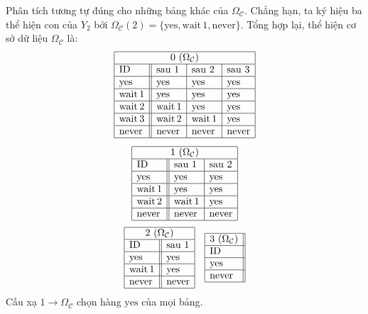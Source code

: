 Phân tích tương tự đúng cho những bảng khác của $\Omega_{\mathcal C}$. Chẳng hạn, ta ký hiệu ba thể hiện con của $Y_2$ bởi $\Omega_{\mathcal C}(2)=\{\mathrm{yes},\mathrm{wait}\,1,\mathrm{never}\}$. Tổng hợp lại, thể hiện cơ sở dữ liệu $\Omega_{\mathcal C}$ là:
\[
\begin{gathered}
\begin{array}{|l||l|l|l|}\hline\multicolumn{4}{|c|}{0\ (\Omega_{\mathcal C})}\\\hline\text{ID}&\text{sau 1}&\text{sau 2}&\text{sau 3}\\\hline
\mathrm{yes}&\mathrm{yes}&\mathrm{yes}&\mathrm{yes}\\\hline
\mathrm{wait}\,1&\mathrm{yes}&\mathrm{yes}&\mathrm{yes}\\\hline
\mathrm{wait}\,2&\mathrm{wait}\,1&\mathrm{yes}&\mathrm{yes}\\\hline
\mathrm{wait}\,3&\mathrm{wait}\,2&\mathrm{wait}\,1&\mathrm{yes}\\\hline
\mathrm{never}&\mathrm{never}&\mathrm{never}&\mathrm{never}\\\hline\end{array}\\[1ex]
\begin{array}{|l||l|l|}\hline\multicolumn{3}{|c|}{1\ (\Omega_{\mathcal C})}\\\hline\text{ID}&\text{sau 1}&\text{sau 2}\\\hline
\mathrm{yes}&\mathrm{yes}&\mathrm{yes}\\\hline
\mathrm{wait}\,1&\mathrm{yes}&\mathrm{yes}\\\hline
\mathrm{wait}\,2&\mathrm{wait}\,1&\mathrm{yes}\\\hline
\mathrm{never}&\mathrm{never}&\mathrm{never}\\\hline\end{array}
\end{gathered}
\]
\[
\begin{array}{|l||l|}\hline\multicolumn{2}{|c|}{2\ (\Omega_{\mathcal C})}\\\hline\text{ID}&\text{sau 1}\\\hline
\mathrm{yes}&\mathrm{yes}\\\hline\mathrm{wait}\,1&\mathrm{yes}\\\hline\mathrm{never}&\mathrm{never}\\\hline\end{array}\quad
\begin{array}{|l||}\hline3\ (\Omega_{\mathcal C})\\\hline\text{ID}\\\hline\mathrm{yes}\\\hline\mathrm{never}\\\hline\end{array}
\]
Cấu xạ $1\to\Omega_{\mathcal C}$ chọn hàng $\mathrm{yes}$ của mọi bảng.

